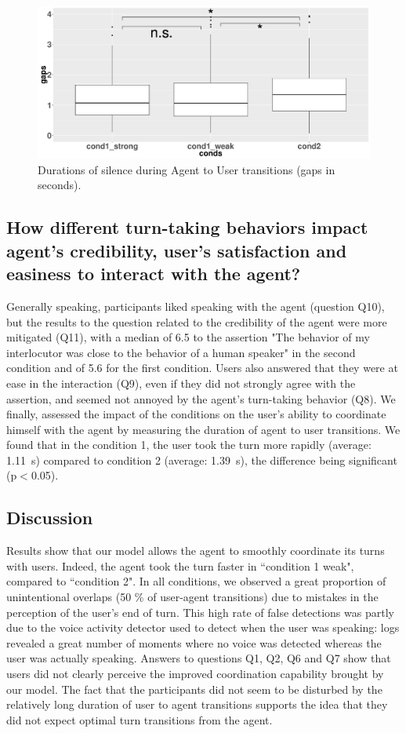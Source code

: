 \begin{figure}
\centering
\includegraphics[width=\linewidth]{figure/boxTransitionsAU.pdf}
\caption{Durations of silence during Agent to User transitions (gaps in seconds).}
\label{box_au}
\end{figure}

\subsection{How different turn-taking behaviors impact agent's credibility,  user's satisfaction and easiness to interact with the agent?}

Generally speaking, participants liked speaking with the agent (question Q10), but the results to the question related to the credibility of the agent were more mitigated (Q11), with a median of 6.5 to the assertion "The behavior of my interlocutor was close to the behavior of a human speaker" in the second condition and of 5.6 for the first condition. Users also answered that they were at ease in the interaction (Q9), even if they did not strongly agree with the assertion, and seemed not annoyed by the agent's turn-taking behavior (Q8). 
We finally, assessed the impact of the conditions on the user's ability to coordinate himself with the agent by measuring the duration of agent to user transitions. We found that in the condition 1, the user took the turn more rapidly (average: 1.11~s) compared to condition 2 (average: 1.39~s), the difference being significant (p$<$0.05). 


\subsection{Discussion}

Results show that our model allows the agent to smoothly coordinate its turns with users. Indeed, the agent took the turn faster in ``condition 1 weak", compared to ``condition 2". In all conditions, we observed a great proportion of unintentional overlaps (50 \% of user-agent transitions) due to mistakes in the perception of the user's end of turn. This high rate of false detections was partly due to the voice activity detector used to detect when the user was speaking: logs revealed a great number of moments where no voice was detected whereas the user was actually speaking. 
Answers to questions Q1, Q2, Q6 and Q7 show that users did not clearly perceive the improved coordination capability brought by our model. The fact that the participants did not seem to be disturbed by the relatively long duration of user to agent transitions supports the idea that they did not expect optimal turn transitions from the agent.


